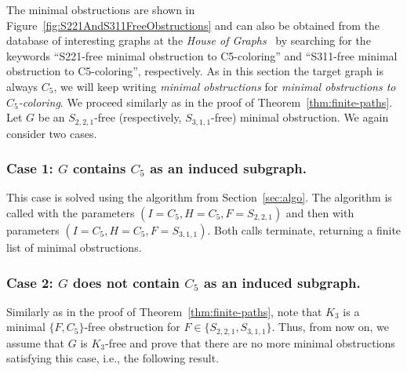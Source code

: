 \documentclass[11pt,a4paper]{article}
\theoremstyle{mystyle}
\begin{document}
\thmfiniteclaws*


The minimal obstructions are shown in Figure~\ref{fig:S221AndS311FreeObstructions} and can also be obtained from the database of interesting graphs at the \textit{House of Graphs}~\cite{DBLP:journals/dam/CoolsaetDG23} by searching for the keywords ``S221-free minimal obstruction to C5-coloring'' and ``S311-free minimal obstruction to C5-coloring'', respectively. As in this section the target graph is always $C_5$, we will keep writing \emph{minimal obstructions} for \emph{minimal obstructions to $C_5$-coloring}.
We proceed similarly as in the proof of Theorem~\ref{thm:finite-paths}.
Let $G$ be an $S_{2,2,1}$-free (respectively, $S_{3,1,1}$-free) minimal obstruction.
We again consider two cases.

\subsubsection*{Case 1: $G$ contains $C_5$ as an induced subgraph.}
This case is solved using the algorithm from Section~\ref{sec:algo}.
The algorithm is called with the parameters $(I=C_5,H=C_5,F=S_{2,2,1})$ and then with parameters $(I=C_5,H=C_5,F=S_{3,1,1})$. Both calls terminate,  returning a finite list of minimal obstructions.

\subsubsection*{Case 2: $G$ does not contain $C_5$ as an induced subgraph.}
Similarly as in the proof of Theorem~\ref{thm:finite-paths}, note that $K_3$ is a minimal $\{F,C_5\}$-free obstruction for $F \in \{S_{2,2,1},S_{3,1,1}\}$.
Thus, from now on, we assume that $G$ is $K_3$-free and prove that there are no more minimal obstructions satisfying this case, i.e., the following result.
\end{document}
